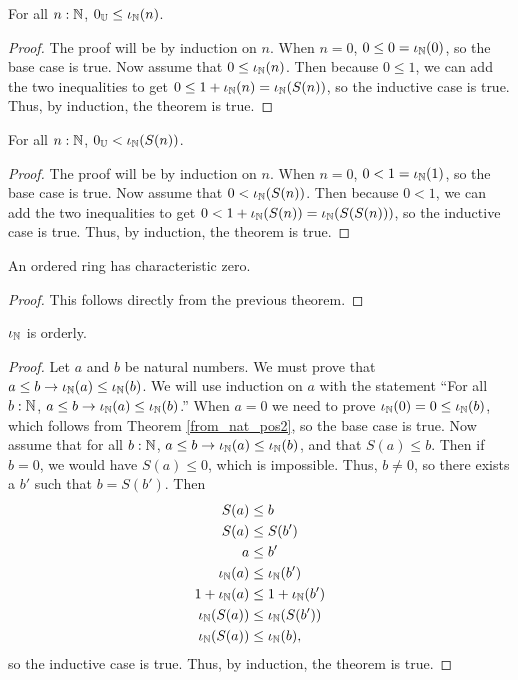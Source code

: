 \documentclass[../../math.tex]{subfiles}
\begin{document}
\begin{theorem} \label{from_nat_pos2}
    For all $n : \mathbb{N}$, $0_{\mathbb{U}} \leq \iota_{\mathbb{N}}(n)$.
\end{theorem}
\begin{proof}
    The proof will be by induction on $n$.  When $n = 0$, $0 \leq 0 = \iota_{\mathbb{N}}(0)$,
    so the base case is true.  Now assume that $0 \leq \iota_{\mathbb{N}}(n)$.  Then because $0
    \leq 1$, we can add the two inequalities to get $0 \leq 1 + \iota_{\mathbb{N}}(n) =
    \iota_{\mathbb{N}}(S(n))$, so the inductive case is true.  Thus, by induction, the theorem
    is true.
\end{proof}

\begin{theorem} \label{from_nat_pos}
    For all $n : \mathbb{N}$, $0_{\mathbb{U}} < \iota_{\mathbb{N}}(S(n))$.
\end{theorem}
\begin{proof}
    The proof will be by induction on $n$.  When $n = 0$, $0 < 1 = \iota_{\mathbb{N}}(1)$, so
    the base case is true.  Now assume that $0 < \iota_{\mathbb{N}}(S(n))$.  Then because $0 <
    1$, we can add the two inequalities to get $0 < 1 + \iota_{\mathbb{N}}(S(n)) =
    \iota_{\mathbb{N}}(S(S(n)))$, so the inductive case is true.  Thus, by induction, the
    theorem is true.
\end{proof}

\begin{instance}
    An ordered ring has characteristic zero.
\end{instance}
\begin{proof}
    This follows directly from the previous theorem.
\end{proof}

\begin{instance}
    $\iota_{\mathbb{N}}$ is orderly.
\end{instance}
\begin{proof}
    Let $a$ and $b$ be natural numbers.  We must prove that $a \leq b
    \rightarrow \iota_{\mathbb{N}}(a) \leq \iota_{\mathbb{N}}(b)$.  We will use induction on $a$ with the
    statement ``For all $b : \mathbb{N}$, $a \leq b \rightarrow \iota_{\mathbb{N}}(a) \leq \iota_{\mathbb{N}}(b)$.''
    When $a = 0$ we need to prove $\iota_{\mathbb{N}}(0) = 0 \leq \iota_{\mathbb{N}}(b)$, which follows from
    Theorem \ref{from_nat_pos2}, so the base case is true.  Now assume that for
    all $b : \mathbb{N}$, $a \leq b \rightarrow \iota_{\mathbb{N}}(a) \leq \iota_{\mathbb{N}}(b)$, and that $S(a) \leq
    b$.  Then if $b = 0$, we would have $S(a) \leq 0$, which is impossible.
    Thus, $b \neq 0$, so there exists a $b'$ such that $b = S(b')$.  Then
    \begin{align*}
        S(a) &\leq b \\
        S(a) &\leq S(b') \\
        a &\leq b' \\
        \iota_{\mathbb{N}}(a) &\leq \iota_{\mathbb{N}}(b') \\
        1 + \iota_{\mathbb{N}}(a) &\leq 1 + \iota_{\mathbb{N}}(b') \\
        \iota_{\mathbb{N}}(S(a)) &\leq \iota_{\mathbb{N}}(S(b')) \\
        \iota_{\mathbb{N}}(S(a)) &\leq \iota_{\mathbb{N}}(b),
    \end{align*}
    so the inductive case is true.  Thus, by induction, the theorem is true.
\end{proof}
\end{document}
